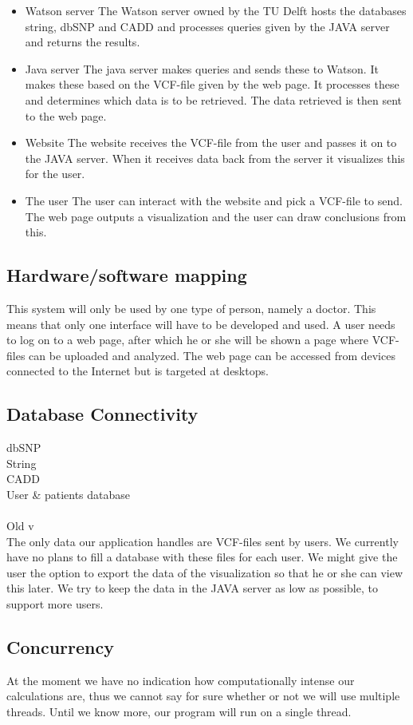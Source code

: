 		\begin{itemize}
			\item Watson server
				\subitem The Watson server owned by the TU Delft hosts the databases string\cite{franceschini2013string}, dbSNP\cite{sherry2001dbsnp} and CADD\cite{kircher2014general} and processes queries given by the JAVA server and returns the results.
			\item Java server
				\subitem The java server makes queries and sends these to Watson. It makes these based on the VCF-file given by the web page. It processes these and determines which data is to be retrieved. The data retrieved is then sent to the web page.
			\item Website
				\subitem The website receives the VCF-file from the user and passes it on to the JAVA server. When it receives data back from the server it visualizes this for the user.
			\item The user 
				\subitem The user can interact with the website and pick a VCF-file to send. The web page outputs a visualization and the user can draw conclusions from this.
		\end{itemize}
	\subsection{Hardware/software mapping}
		This system will only be used by one type of person, namely a doctor. This means that only one interface will have to be developed and used. A user needs to log on to a web page, after which he or she will be shown a page where VCF-files can be uploaded and analyzed. The web page can be accessed from devices connected to the Internet but is targeted at desktops.
	\subsection{Database Connectivity}
		dbSNP\\
		String\\
		CADD\\
		User \& patients database\\\\
		Old v\\
		The only data our application handles are VCF-files sent by users. We currently have no plans to fill a database with these files for each user. We might give the user the option to export the data of the visualization so that he or she can view this later. We try to keep the data in the JAVA server as low as possible, to support more users.
	\subsection{Concurrency }
		At the moment we have no indication how computationally intense our calculations are, thus we cannot say for sure whether or not we will use multiple threads. Until we know more, our program will run on a single thread.
		